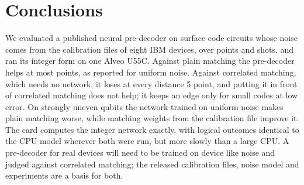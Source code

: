\section{Conclusions}\label{sec:conclusions}

We evaluated a published neural pre-decoder on surface code circuits whose noise comes from the calibration files
of eight IBM devices, over \NumPoints{} points and \TotalShots{} shots, and ran its integer form on one Alveo U55C.
Against plain matching the pre-decoder helps at most points, as reported for uniform noise. Against correlated
matching, which needs no network, it loses at every distance 5 point, and putting it in front of correlated matching
does not help; it keeps an edge only for small codes at low error. On strongly uneven qubits the network trained on
uniform noise makes plain matching worse, while matching weights from the calibration file improve it. The card
computes the integer network exactly, with logical outcomes identical to the CPU model wherever both were run, but
more slowly than a large
CPU. A pre-decoder for real devices will need to be trained on device like noise and judged against correlated
matching; the released calibration files, noise model and experiments are a basis for both.
